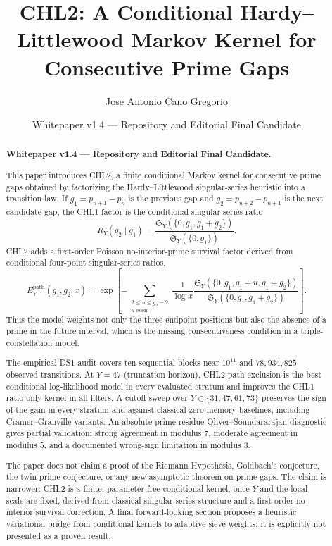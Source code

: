 \documentclass[10pt]{article}
\title{CHL2: A Conditional Hardy--Littlewood Markov Kernel for Consecutive Prime Gaps}
\author{Jose Antonio Cano Gregorio}
\date{Whitepaper v1.4 --- Repository and Editorial Final Candidate}
\newcommand{\SY}{\mathfrak{S}_Y}
\newcommand{\Epath}{E_Y^{\mathrm{path}}}
\begin{document}
\maketitle
\begin{abstract}
\noindent\textbf{Whitepaper v1.4 --- Repository and Editorial Final Candidate.}\par
This paper introduces CHL2, a finite conditional Markov kernel for consecutive prime gaps obtained by factorizing the Hardy--Littlewood singular-series heuristic into a transition law.  If $g_1=p_{n+1}-p_n$ is the previous gap and $g_2=p_{n+2}-p_{n+1}$ is the next candidate gap, the CHL1 factor is the conditional singular-series ratio
\[
R_Y(g_2\mid g_1)=\frac{\SY(\{0,g_1,g_1+g_2\})}{\SY(\{0,g_1\})}.
\]
CHL2 adds a first-order Poisson no-interior-prime survival factor derived from conditional four-point singular-series ratios,
\[
\Epath(g_1,g_2;x)=\exp\!\left[-\sum_{\substack{2\le u\le g_2-2\\u\ \mathrm{even}}}\frac{1}{\log x}\frac{\SY(\{0,g_1,g_1+u,g_1+g_2\})}{\SY(\{0,g_1,g_1+g_2\})}\right].
\]
Thus the model weights not only the three endpoint positions but also the absence of a prime in the future interval, which is the missing consecutiveness condition in a triple-constellation model.

The empirical DS1 audit covers ten sequential blocks near $10^{11}$ and $78{,}934{,}825$ observed transitions. At $Y=47$ (truncation horizon), CHL2 path-exclusion is the best conditional log-likelihood model in every evaluated stratum and improves the CHL1 ratio-only kernel in all filters. A cutoff sweep over $Y\in\{31,47,61,73\}$ preserves the sign of the gain in every stratum and against classical zero-memory baselines, including Cramer--Granville variants. An absolute prime-residue Oliver--Soundararajan diagnostic gives partial validation: strong agreement in modulus $7$, moderate agreement in modulus $5$, and a documented wrong-sign limitation in modulus $3$.

The paper does not claim a proof of the Riemann Hypothesis, Goldbach's conjecture, the twin-prime conjecture, or any new asymptotic theorem on prime gaps. The claim is narrower: CHL2 is a finite, parameter-free conditional kernel, once $Y$ and the local scale are fixed, derived from classical singular-series structure and a first-order no-interior survival correction. A final forward-looking section proposes a heuristic variational bridge from conditional kernels to adaptive sieve weights; it is explicitly not presented as a proven result.
\end{abstract}
\tableofcontents
\listoffigures
\newpage
\end{document}
